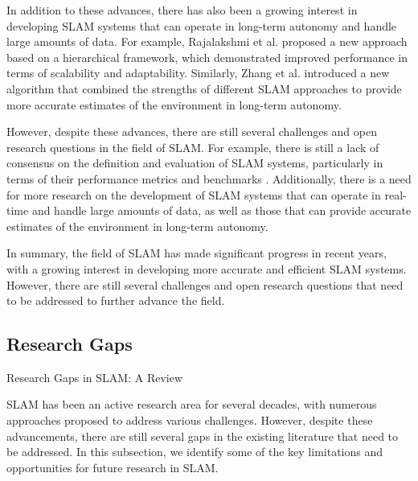 \documentclass[conference]{IEEEtran}
\begin{document}
In addition to these advances, there has also been a growing interest in developing SLAM systems that can operate in long-term autonomy and handle large amounts of data. For example, Rajalakshmi et al. \cite{rajalakshmi2017} proposed a new approach based on a hierarchical framework, which demonstrated improved performance in terms of scalability and adaptability. Similarly, Zhang et al. \cite{zhang2019} introduced a new algorithm that combined the strengths of different SLAM approaches to provide more accurate estimates of the environment in long-term autonomy.

However, despite these advances, there are still several challenges and open research questions in the field of SLAM. For example, there is still a lack of consensus on the definition and evaluation of SLAM systems, particularly in terms of their performance metrics and benchmarks \cite{khan2019}. Additionally, there is a need for more research on the development of SLAM systems that can operate in real-time and handle large amounts of data, as well as those that can provide accurate estimates of the environment in long-term autonomy.

In summary, the field of SLAM has made significant progress in recent years, with a growing interest in developing more accurate and efficient SLAM systems. However, there are still several challenges and open research questions that need to be addressed to further advance the field.

\subsection{Research Gaps}
Research Gaps in SLAM: A Review

SLAM has been an active research area for several decades, with numerous approaches proposed to address various challenges. However, despite these advancements, there are still several gaps in the existing literature that need to be addressed. In this subsection, we identify some of the key limitations and opportunities for future research in SLAM.
\end{document}
